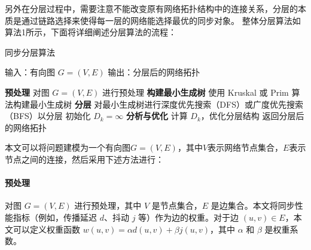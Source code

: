 \documentclass[UTF8,a4paper,12pt]{ctexart}
\numberwithin{equation}{section}
\begin{document}
	\begin{figure}[htb]
	\end{figure}
	
	另外在分层过程中，需要注意不能改变原有网络拓扑结构中的连接关系，分层的本质是通过链路选择来使得每一层的网络能选择最优的同步对象。
	整体分层算法如算法1所示，下面将详细阐述分层算法的流程：
	\begin{algorithm}
		\caption{同步分层算法}
		\begin{algorithmic}[1]
			\STATE 输入：有向图 $G=(V, E)$
			\STATE 输出：分层后的网络拓扑
			
			\STATE \textbf{预处理} 对图 $G=(V, E)$ 进行预处理
			\STATE \textbf{构建最小生成树} 使用 Kruskal 或 Prim 算法构建最小生成树
			\STATE \textbf{分层} 对最小生成树进行深度优先搜索（DFS）或广度优先搜索（BFS）以分层
			\STATE 初始化 $D_k = \infty$
			\STATE \textbf{分析与优化} 计算 $D_k$，优化分层结构
			\ENDWHILE
			\STATE 返回分层后的网络拓扑
		\end{algorithmic}
	\end{algorithm}
	
	本文可以将问题建模为一个有向图$G=(V, E)$，其中$V$表示网络节点集合，$E$表示节点之间的连接，然后采用下述方法进行：
	\paragraph{预处理}对图 $G=(V,E)$ 进行预处理，其中 $V$ 是节点集合，$E$ 是边集合。本文将同步性能指标（例如，传播延迟 $d$、抖动 $j$ 等）作为边的权重。对于边 $(u, v) \in E$，本文可以定义权重函数 $w(u, v) = \alpha d(u, v) + \beta j(u, v)$，其中 $\alpha$ 和 $\beta$ 是权重系数。
	
\end{document}
